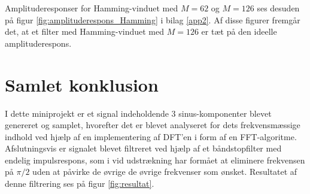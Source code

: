 Amplituderesponser for Hamming-vinduet med $M = 62$ og $M = 126$ ses desuden på figur \ref{fig:amplituderespons_Hamming} i bilag \ref{app2}. Af disse figurer fremgår det, at et filter med Hamming-vinduet med $M = 126$ er tæt på den ideelle amplituderespons.

\section{Samlet konklusion}
I dette miniprojekt er et signal indeholdende 3 sinus-komponenter blevet genereret og samplet, hvorefter det er blevet analyseret for dets frekvensmæssige indhold ved hjælp af en implementering af DFT'en i form af en FFT-algoritme. Afslutningsvis er signalet blevet filtreret ved hjælp af et båndstopfilter med endelig impulsrespons, som i vid udstrækning har formået at eliminere frekvensen på $\pi/2$ uden at påvirke de øvrige de øvrige frekvenser som ønsket. Resultatet af denne filtrering ses på figur \ref{fig:resultat}.